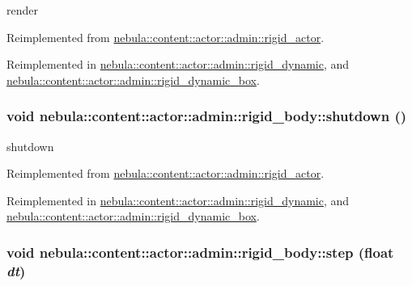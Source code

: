 render 

Reimplemented from \hyperlink{classnebula_1_1content_1_1actor_1_1admin_1_1rigid__actor_a2d1920022481d1e32da69c777ce73541}{nebula::content::actor::admin::rigid\_\-actor}.

Reimplemented in \hyperlink{classnebula_1_1content_1_1actor_1_1admin_1_1rigid__dynamic_a891dd9d18ef100af72427ebaea9e473a}{nebula::content::actor::admin::rigid\_\-dynamic}, and \hyperlink{classnebula_1_1content_1_1actor_1_1admin_1_1rigid__dynamic__box_a7e5e4c2e52b7b02c7d667cb74926e8a2}{nebula::content::actor::admin::rigid\_\-dynamic\_\-box}.\hypertarget{classnebula_1_1content_1_1actor_1_1admin_1_1rigid__body_ab0ed9e145b42efdd0049e2e1ef7d5da4}{
\subsubsection[{shutdown}]{\setlength{\rightskip}{0pt plus 5cm}void nebula::content::actor::admin::rigid\_\-body::shutdown ()}}
\label{classnebula_1_1content_1_1actor_1_1admin_1_1rigid__body_ab0ed9e145b42efdd0049e2e1ef7d5da4}


shutdown 

Reimplemented from \hyperlink{classnebula_1_1content_1_1actor_1_1admin_1_1rigid__actor_afe9a6592087cac6054f6416d7c617eaa}{nebula::content::actor::admin::rigid\_\-actor}.

Reimplemented in \hyperlink{classnebula_1_1content_1_1actor_1_1admin_1_1rigid__dynamic_a6b7e8768902a320d8f7f483cf348a059}{nebula::content::actor::admin::rigid\_\-dynamic}, and \hyperlink{classnebula_1_1content_1_1actor_1_1admin_1_1rigid__dynamic__box_af3ecd05192435e30fbe258f243d18adc}{nebula::content::actor::admin::rigid\_\-dynamic\_\-box}.\hypertarget{classnebula_1_1content_1_1actor_1_1admin_1_1rigid__body_a91d4e1a3e78ee41a5ddea1974a88045d}{
\subsubsection[{step}]{\setlength{\rightskip}{0pt plus 5cm}void nebula::content::actor::admin::rigid\_\-body::step (float {\em dt})}}
\label{classnebula_1_1content_1_1actor_1_1admin_1_1rigid__body_a91d4e1a3e78ee41a5ddea1974a88045d}


